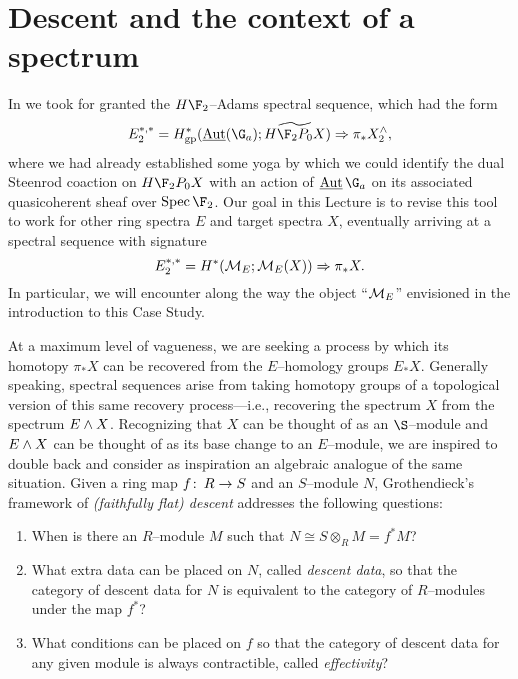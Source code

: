 \section{Descent and the context of a spectrum}\label{StableContextLecture}


In  we took for granted the $H\F_2$--Adams spectral sequence, which had the form \[E_2^{*, *} = H^*_{\mathrm{gp}}(\InternalAut(\G_a); \widetilde{H\F_2P_0 X}) \Rightarrow \pi_* X^\wedge_2,\] where we had already established some yoga by which we could identify the dual Steenrod coaction on $H\F_2P_0 X$ with an action of $\InternalAut{\G_a}$ on its associated quasicoherent sheaf over $\Spec \F_2$.  Our goal in this Lecture is to revise this tool to work for other ring spectra $E$ and target spectra $X$, eventually arriving at a spectral sequence with signature \[E_2^{*, *} = H^*(\mathcal{M}_{E}; \mathcal{M}_{E}(X)) \Rightarrow \pi_* X.\]  In particular, we will encounter along the way the object ``$\mathcal{M}_{E}$'' envisioned in the introduction to this Case Study.

At a maximum level of vagueness, we are seeking a process by which its homotopy $\pi_* X$ can be recovered from the $E$--homology groups $E_* X$.  Generally speaking, spectral sequences arise from taking homotopy groups of a topological version of this same recovery process---i.e., recovering the spectrum $X$ from the spectrum $E \wedge X$.  Recognizing that $X$ can be thought of as an $\S$--module and $E \wedge X$ can be thought of as its base change to an $E$--module, we are inspired to double back and consider as inspiration an algebraic analogue of the same situation.  Given a ring map $f\colon\thinspace R \to S$ and an $S$--module $N$, Grothendieck's framework of \textit{(faithfully flat) descent} addresses the following questions:
\begin{enumerate}
\item When is there an $R$--module $M$ such that $N \cong S \otimes_R M = f^* M$?
\item What extra data can be placed on $N$, called \textit{descent data}, so that the category of descent data for $N$ is equivalent to the category of $R$--modules under the map $f^*$?
\item What conditions can be placed on $f$ so that the category of descent data for any given module is always contractible, called \textit{effectivity}?
\end{enumerate}

